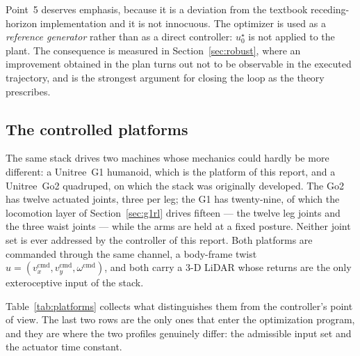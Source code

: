 \documentclass[11pt,a4paper]{article}
\begin{document}
Point~5 deserves emphasis, because it is a deviation from the textbook receding-horizon implementation and it
is not innocuous. The optimizer is used as a \emph{reference generator} rather than as a direct controller:
$u^\star_0$ is not applied to the plant. The consequence is measured in Section~\ref{sec:robust}, where an
improvement obtained in the plan turns out not to be observable in the executed trajectory, and is the
strongest argument for closing the loop as the theory prescribes.

\subsection{The controlled platforms}
\label{sec:platforms}

The same stack drives two machines whose mechanics could hardly be more different: a Unitree~G1 humanoid,
which is the platform of this report, and a Unitree~Go2 quadruped, on which the stack was originally
developed. The Go2 has twelve actuated joints, three per leg; the G1 has twenty-nine, of which the locomotion
layer of Section~\ref{sec:g1rl} drives fifteen --- the twelve leg joints and the three waist joints --- while
the arms are held at a fixed posture. Neither joint set is ever addressed by the controller of this report.
Both platforms are commanded through the same channel, a body-frame twist
$u=(v_x^{\mathrm{cmd}},v_y^{\mathrm{cmd}},\omega^{\mathrm{cmd}})$, and both carry a 3-D LiDAR whose returns
are the only exteroceptive input of the stack.

Table~\ref{tab:platforms} collects what distinguishes them from the controller's point of view. The last two
rows are the only ones that enter the optimization program, and they are where the two profiles genuinely
differ: the admissible input set and the actuator time constant.
\end{document}
